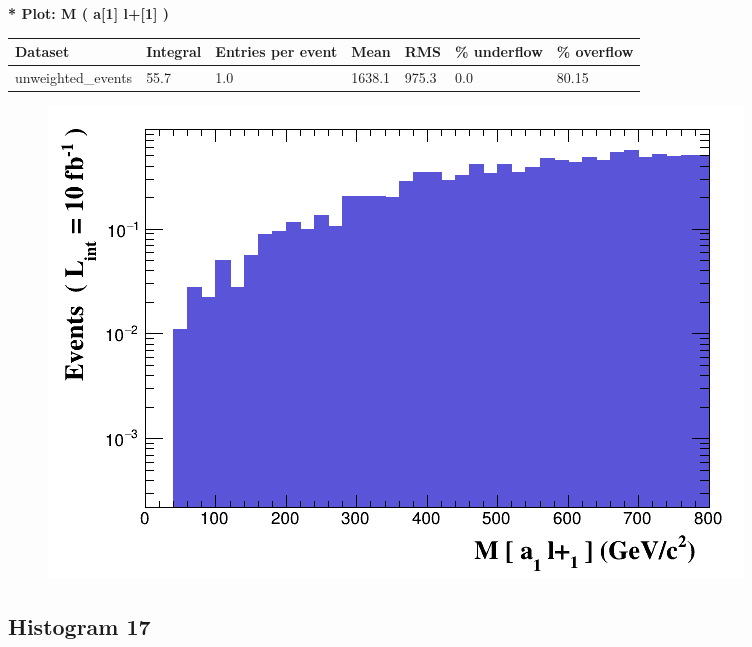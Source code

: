\documentclass[a4paper, 10pt]{article}
\begin{document}
\textbf{* Plot: M ( a[1] l+[1] ) }\\
   \begin{table}[H]
  \begin{center}
    \begin{tabular}{|m{23.0mm}|m{23.0mm}|m{18.0mm}|m{19.0mm}|m{19.0mm}|m{19.0mm}|m{19.0mm}|}
      \hline
      {\cellcolor{yellow}         Dataset}& {\cellcolor{yellow}         Integral}& {\cellcolor{yellow}         Entries per event}& {\cellcolor{yellow}         Mean}& {\cellcolor{yellow}         RMS}& {\cellcolor{yellow}         \% underflow}& {\cellcolor{yellow}         \% overflow}\\
      \hline
      {\cellcolor{white}         unweighted\_events}& {\cellcolor{white}         55.7}& {\cellcolor{white}         1.0}& {\cellcolor{white}         1638.1}& {\cellcolor{white}         975.3}& {\cellcolor{red}         0.0}& {\cellcolor{red}         80.15}\\
\hline
    \end{tabular}
  \end{center}
\end{table}

\begin{figure}[H]
  \begin{center}
    \includegraphics[scale=0.45]{selection_15.png}\\
\caption{   }
  \end{center}
\end{figure}
      \newpage
\subsection{ Histogram 17}
\end{document}
